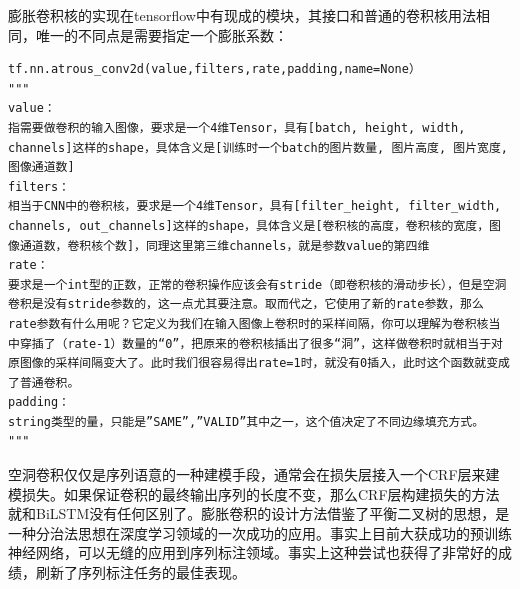 \documentclass[twoside,a4paper,12pt]{book}%
\begin{document}
膨胀卷积核的实现在tensorflow中有现成的模块，其接口和普通的卷积核用法相同，唯一的不同点是需要指定一个膨胀系数：
\begin{lstlisting}
tf.nn.atrous_conv2d(value,filters,rate,padding,name=None）
"""
value：
指需要做卷积的输入图像，要求是一个4维Tensor，具有[batch, height, width, channels]这样的shape，具体含义是[训练时一个batch的图片数量, 图片高度, 图片宽度, 图像通道数]
filters：
相当于CNN中的卷积核，要求是一个4维Tensor，具有[filter_height, filter_width, channels, out_channels]这样的shape，具体含义是[卷积核的高度，卷积核的宽度，图像通道数，卷积核个数]，同理这里第三维channels，就是参数value的第四维
rate：
要求是一个int型的正数，正常的卷积操作应该会有stride（即卷积核的滑动步长），但是空洞卷积是没有stride参数的，这一点尤其要注意。取而代之，它使用了新的rate参数，那么rate参数有什么用呢？它定义为我们在输入图像上卷积时的采样间隔，你可以理解为卷积核当中穿插了（rate-1）数量的“0”，把原来的卷积核插出了很多“洞”，这样做卷积时就相当于对原图像的采样间隔变大了。此时我们很容易得出rate=1时，就没有0插入，此时这个函数就变成了普通卷积。
padding：
string类型的量，只能是”SAME”,”VALID”其中之一，这个值决定了不同边缘填充方式。
"""
\end{lstlisting}

空洞卷积仅仅是序列语意的一种建模手段，通常会在损失层接入一个\gls{CRF}层来建模损失。如果保证卷积的最终输出序列的长度不变，那么\gls{CRF}层构建损失的方法就和BiLSTM没有任何区别了。膨胀卷积的设计方法借鉴了平衡二叉树的思想，是一种分治法思想在深度学习领域的一次成功的应用。事实上目前大获成功的预训练神经网络，可以无缝的应用到序列标注领域。事实上这种尝试也获得了非常好的成绩，刷新了序列标注任务的最佳表现。
\end{document}
